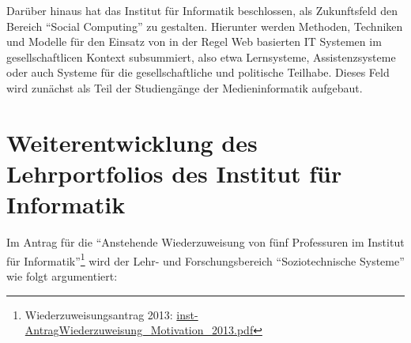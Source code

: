 Darüber hinaus hat das Institut für Informatik beschlossen, als
Zukunftsfeld den Bereich ``Social Computing'' zu gestalten. Hierunter
werden Methoden, Techniken und Modelle für den Einsatz von in der Regel
Web basierten IT Systemen im gesellschaftlicen Kontext subsummiert, also
etwa Lernsysteme, Assistenzsysteme oder auch Systeme für die
gesellschaftliche und politische Teilhabe. Dieses Feld wird zunächst als
Teil der Studiengänge der Medieninformatik aufgebaut.

\section{Weiterentwicklung des Lehrportfolios des Institut für
Informatik}\label{weiterentwicklung-des-lehrportfolios-des-institut-fuxfcr-informatik}

Im Antrag für die ``Anstehende Wiederzuweisung von fünf Professuren im
Institut für Informatik''\footnote{Wiederzuweisungsantrag 2013:
  \href{https://th-koeln.github.io/mi-2017/anhaenge/inst-AntragWiederzuweisung_Motivation_2013.pdf}{inst-AntragWiederzuweisung\_Motivation\_2013.pdf}}
wird der Lehr- und Forschungsbereich ``Soziotechnische Systeme'' wie
folgt argumentiert:

